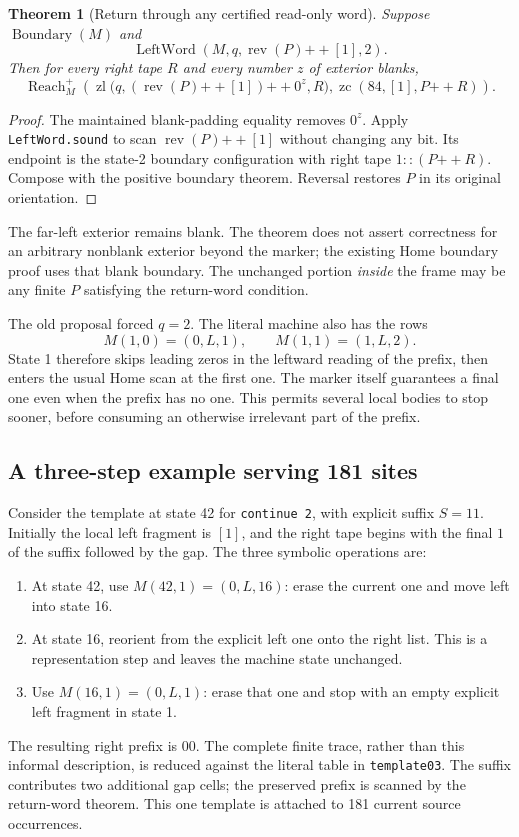 \documentclass[11pt]{article}
\newtheorem{theorem}{Theorem}[section]
\theoremstyle{definition}\newtheorem{definition}[theorem]{Definition}
\theoremstyle{remark}\newtheorem{remark}[theorem]{Remark}
\newcommand{\cat}{\mathbin{+\!+}}
\newcommand{\rev}{\operatorname{rev}}
\newcommand{\Reachp}{\operatorname{Reach}^{+}}
\newcommand{\code}[1]{\nolinkurl{#1}}
\begin{document}
\begin{theorem}[Return through any certified read-only word]\label{thm:home}
Suppose $\operatorname{Boundary}(M)$ and
\[
 \operatorname{LeftWord}(M,q,\rev(P)\cat[1],2).
\]
Then for every right tape $R$ and every number $z$ of exterior blanks,
\[
 \Reachp_M\left(
   \operatorname{zl}\bigl(q,(\rev(P)\cat[1])\cat0^z,R\bigr),
   \operatorname{zc}(84,[1],P\cat R)
 \right).
\]
\end{theorem}
\begin{proof}
The maintained blank-padding equality removes $0^z$. Apply \code{LeftWord.sound} to scan $\rev(P)\cat[1]$ without changing any bit. Its endpoint is the state-2 boundary configuration with right tape $1::(P\cat R)$. Compose with the positive boundary theorem. Reversal restores $P$ in its original orientation.
\end{proof}

The far-left exterior remains blank. The theorem does not assert correctness for an arbitrary nonblank exterior beyond the marker; the existing Home boundary proof uses that blank boundary. The unchanged portion \emph{inside} the frame may be any finite $P$ satisfying the return-word condition.

The old proposal forced $q=2$. The literal machine also has the rows
\[
 M(1,0)=(0,L,1),\qquad M(1,1)=(1,L,2).
\]
State 1 therefore skips leading zeros in the leftward reading of the prefix, then enters the usual Home scan at the first one. The marker itself guarantees a final one even when the prefix has no one. This permits several local bodies to stop sooner, before consuming an otherwise irrelevant part of the prefix.

\subsection{A three-step example serving 181 sites}

Consider the template at state 42 for \code{continue 2}, with explicit suffix $S=11$. Initially the local left fragment is $[1]$, and the right tape begins with the final $1$ of the suffix followed by the gap. The three symbolic operations are:
\begin{enumerate}
\item At state 42, use $M(42,1)=(0,L,16)$: erase the current one and move left into state 16.
\item At state 16, reorient from the explicit left one onto the right list. This is a representation step and leaves the machine state unchanged.
\item Use $M(16,1)=(0,L,1)$: erase that one and stop with an empty explicit left fragment in state 1.
\end{enumerate}
The resulting right prefix is $00$. The complete finite trace, rather than this informal description, is reduced against the literal table in \code{template03}. The suffix contributes two additional gap cells; the preserved prefix is scanned by the return-word theorem. This one template is attached to 181 current source occurrences.
\end{document}

